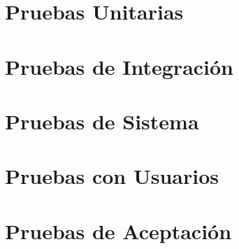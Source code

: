 
\section{Pruebas Unitarias}
\label{sc:UT}

\section{Pruebas de Integración}
\label{sc:IT}

\section{Pruebas de Sistema}
\label{ssc:PS}

\section{Pruebas con Usuarios}
\label{sc:PU}

\section{Pruebas de Aceptación}
\label{sc:PA}
